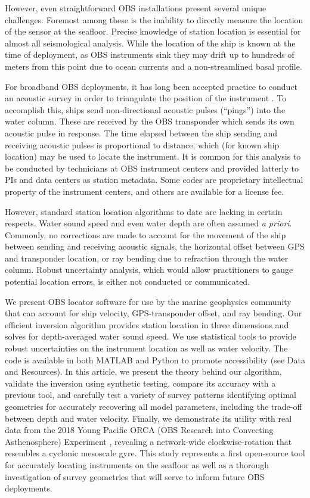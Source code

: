 \documentclass[10pt,titlepage]{article}
\providecommand{\DIFaddtex}[1]{{\protect\color{blue}\uwave{#1}}} %
\providecommand{\DIFaddbegin}{} %
\providecommand{\DIFaddend}{} %
\providecommand{\DIFadd}[1]{\texorpdfstring{\DIFaddtex{#1}}{#1}} %
\begin{document}
However, even straightforward OBS installations present several unique challenges. Foremost among these is the inability to directly measure the location of the sensor at the seafloor. Precise knowledge of station location is essential for almost all seismological analysis. While the location of the ship is known at the time of deployment, as OBS instruments sink they may drift up to hundreds of meters from this point due to ocean currents and a non-streamlined basal profile. 

For broadband OBS deployments, it has long been accepted practice to conduct an acoustic survey in order to triangulate the position of the instrument \citep[e.g.,][]{Creager1982}. To accomplish this, ships send non-directional acoustic pulses (``pings'') into the water column. These are received by the OBS transponder which sends its own acoustic pulse in response. The time elapsed between the ship sending and receiving acoustic pulses is proportional to distance, which (for known ship location) may be used to locate the instrument. It is common for this analysis to be conducted by technicians at OBS instrument centers and provided latterly to PIs and data centers as station metadata. Some codes are proprietary intellectual property of the instrument centers, and others are available for a license fee. 

However, standard station location algorithms to date are lacking in certain respects. Water sound speed and even water depth are often assumed \textit{a priori}. Commonly, no corrections are made to account for the movement of the ship between sending and receiving acoustic signals, the horizontal offset between GPS and transponder location, or ray bending due to refraction through the water column. Robust uncertainty analysis, which would allow practitioners to gauge potential location errors, is either not conducted or communicated.

We present \DIFaddbegin \DIFadd{an }\DIFaddend OBS locator software for use by the marine geophysics community that can account for ship velocity, GPS-transponder offset, and ray bending. Our efficient inversion algorithm provides station location in three dimensions and solves for depth-averaged water sound speed. We use statistical tools to provide robust uncertainties on the instrument location as well as water velocity. The code is available in both MATLAB and Python to promote accessibility (see Data and Resources). In this article, we present the theory behind our algorithm, validate the inversion using synthetic testing, compare its accuracy with a previous tool, and carefully test a variety of survey patterns identifying optimal geometries for accurately recovering all model parameters, including the trade-off between depth and water velocity. Finally, we demonstrate its utility with real data from the 2018 Young Pacific ORCA (OBS Research into Convecting Asthenosphere) Experiment \citep{Gaherty2018}, revealing a network-wide clockwise-rotation that resembles a cyclonic mesoscale gyre. This study represents a first open-source tool for accurately locating instruments on the seafloor as well as a thorough investigation of survey geometries that will serve to inform future OBS deployments.
\end{document}
